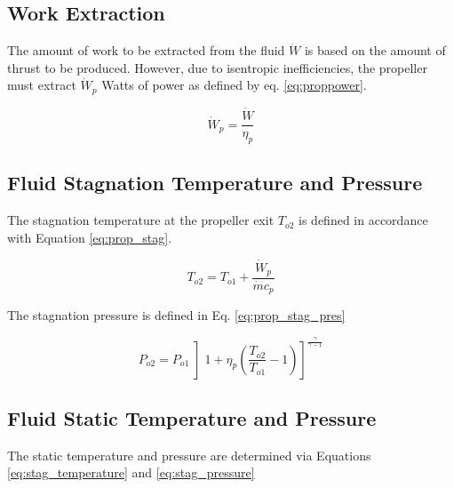 \subsection{Work Extraction}
The amount of work to be extracted from the fluid $\dot{W}$ is based on the amount of thrust to be produced.  However, due to 
isentropic inefficiencies, the propeller must extract $\dot{W}_p$ Watts of power as defined by eq. \ref{eq:proppower}.

\begin{equation}
\label{eq:proppower}
\dot{W}_p=\frac{\dot{W}}{\eta_p}
\end{equation}

\subsection{Fluid Stagnation Temperature and Pressure}
The stagnation temperature at the propeller exit $T_{o2}$ is defined in accordance with Equation \ref{eq:prop_stag}.

\begin{equation}
\label{eq:prop_stag}
T_{o2} = T_{o1} + \frac{\dot{W}_p}{\dot{m}c_p}
\end{equation}

The stagnation pressure is defined in Eq. \ref{eq:prop_stag_pres}

\begin{equation}
\label{eq:prop_stag_pres}
P_{o2}=P_{o1}\left]1 + \eta_p\left(\frac{T_{o2}}{T_{o1}} -1\right) \right]^{\frac{\gamma}{\gamma - 1}}
\end{equation}

\subsection{Fluid Static Temperature and Pressure}
The static temperature and pressure are determined via Equations \ref{eq:stag_temperature} and \ref{eq:stag_pressure}

